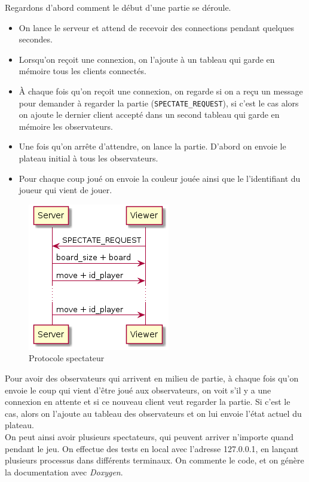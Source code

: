 \documentclass[a4paper]{article}
\begin{document}
\noindent Regardons d'abord comment le début d'une partie se déroule.
\begin{itemize}
	\setlength\itemsep{0.5em}
	\item On lance le serveur et attend de recevoir des connections pendant 
	quelques secondes.
	\item Lorsqu'on reçoit une connexion, on l'ajoute à un tableau qui garde en 
	mémoire tous les clients connectés.
	\item À chaque fois qu'on reçoit une connexion, on regarde si on a reçu un 
	message pour demander à regarder la partie (\texttt{SPECTATE\_REQUEST}), si c'est le cas alors on ajoute 
	le dernier client accepté dans un second tableau qui garde en mémoire les 
	observateurs.
	\item Une fois qu'on arrête d'attendre, on lance la partie. D'abord on 
	envoie le plateau initial à tous les observateurs.
	\item Pour chaque coup joué on envoie la couleur jouée ainsi que le 
	l'identifiant du joueur qui vient de jouer. \\
\end{itemize}

%
\begin{figure}[H]
	\centering
	\includegraphics[scale=0.6]{viewer.png}
	\caption{Protocole spectateur}
\end{figure}
%

\noindent Pour avoir des observateurs qui arrivent en milieu de partie, à chaque fois
qu'on envoie le coup qui vient d'être joué aux observateurs, on voit s'il y a
une connexion en attente et si ce nouveau client veut regarder la partie. Si c'est le cas, alors 
on l'ajoute au tableau des observateurs et on lui envoie l'état actuel du
plateau. \\

On peut ainsi avoir plusieurs spectateurs, qui peuvent arriver n'importe quand pendant le jeu. On effectue des tests en local avec l'adresse 127.0.0.1, en lançant plusieurs processus dans différents terminaux. On commente le code, et on génère la documentation avec \emph{Doxygen}.
\end{document}
